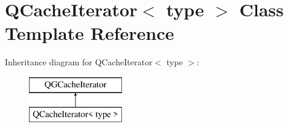 \hypertarget{class_q_cache_iterator}{}\section{Q\+Cache\+Iterator$<$ type $>$ Class Template Reference}
\label{class_q_cache_iterator}
Inheritance diagram for Q\+Cache\+Iterator$<$ type $>$\+:\begin{figure}[H]
\begin{center}
\leavevmode
\includegraphics[height=2.000000cm]{class_q_cache_iterator}
\end{center}
\end{figure}

